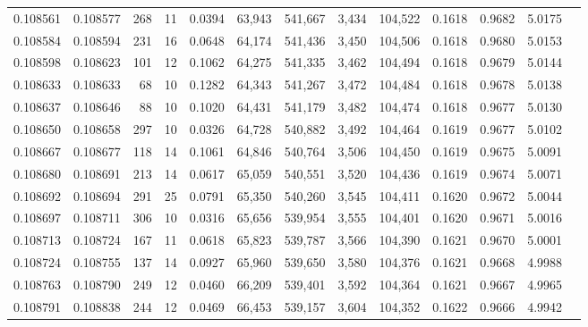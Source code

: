 \begin{tabular}{rrrrrrrrrrrrr}
0.108561 & 0.108577 &   268 &  11 &                                     0.0394 &  63,943 & 541,667 &   3,434 & 104,522 & 0.1618 & 0.9682 & 5.0175 \\
0.108584 & 0.108594 &   231 &  16 &                                     0.0648 &  64,174 & 541,436 &   3,450 & 104,506 & 0.1618 & 0.9680 & 5.0153 \\
0.108598 & 0.108623 &   101 &  12 &                                     0.1062 &  64,275 & 541,335 &   3,462 & 104,494 & 0.1618 & 0.9679 & 5.0144 \\
0.108633 & 0.108633 &    68 &  10 &                                     0.1282 &  64,343 & 541,267 &   3,472 & 104,484 & 0.1618 & 0.9678 & 5.0138 \\
0.108637 & 0.108646 &    88 &  10 &                                     0.1020 &  64,431 & 541,179 &   3,482 & 104,474 & 0.1618 & 0.9677 & 5.0130 \\
0.108650 & 0.108658 &   297 &  10 &                                     0.0326 &  64,728 & 540,882 &   3,492 & 104,464 & 0.1619 & 0.9677 & 5.0102 \\
0.108667 & 0.108677 &   118 &  14 &                                     0.1061 &  64,846 & 540,764 &   3,506 & 104,450 & 0.1619 & 0.9675 & 5.0091 \\
0.108680 & 0.108691 &   213 &  14 &                                     0.0617 &  65,059 & 540,551 &   3,520 & 104,436 & 0.1619 & 0.9674 & 5.0071 \\
0.108692 & 0.108694 &   291 &  25 &                                     0.0791 &  65,350 & 540,260 &   3,545 & 104,411 & 0.1620 & 0.9672 & 5.0044 \\
0.108697 & 0.108711 &   306 &  10 &                                     0.0316 &  65,656 & 539,954 &   3,555 & 104,401 & 0.1620 & 0.9671 & 5.0016 \\
0.108713 & 0.108724 &   167 &  11 &                                     0.0618 &  65,823 & 539,787 &   3,566 & 104,390 & 0.1621 & 0.9670 & 5.0001 \\
0.108724 & 0.108755 &   137 &  14 &                                     0.0927 &  65,960 & 539,650 &   3,580 & 104,376 & 0.1621 & 0.9668 & 4.9988 \\
0.108763 & 0.108790 &   249 &  12 &                                     0.0460 &  66,209 & 539,401 &   3,592 & 104,364 & 0.1621 & 0.9667 & 4.9965 \\
0.108791 & 0.108838 &   244 &  12 &                                     0.0469 &  66,453 & 539,157 &   3,604 & 104,352 & 0.1622 & 0.9666 & 4.9942 \\

\end{tabular}
